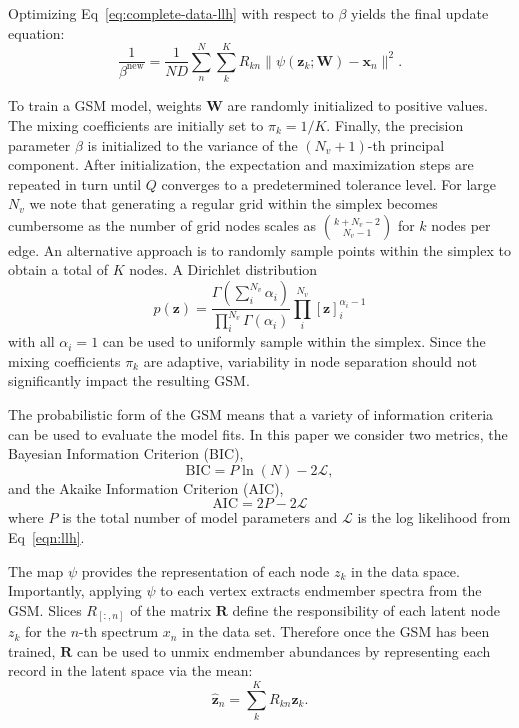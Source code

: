 \documentclass[remotesensing,article,submit,pdftex,moreauthors]{Definitions/mdpi}
\begin{document}
Optimizing Eq~\ref{eq:complete-data-llh} with respect to $\beta$ yields the final update equation:
\begin{equation}\label{eq:beta-update}
    \frac{1}{\beta^{\text{new}}}  = \frac{1}{ND}\sum\limits_n^N\sum\limits_k^K R_{kn}\lVert \psi(\mathbf{z}_k; \mathbf{W}) - \mathbf{x}_n \rVert^2.
\end{equation}

To train a GSM model, weights $\mathbf{W}$ are randomly initialized to positive values. The mixing coefficients are initially set to $\pi_k = 1/K$. Finally, the precision parameter $\beta$ is initialized to the variance of the $(N_v+1)$-th principal component. After initialization, the expectation and maximization steps are repeated in turn until $Q$ converges to a predetermined tolerance level. For large $N_v$ we note that generating a regular grid within the simplex becomes cumbersome as the number of grid nodes scales as ${k + N_v - 2 \choose N_v - 1}$ for $k$ nodes per edge. An alternative approach is to randomly sample points within the simplex to obtain a total of $K$ nodes. A Dirichlet distribution 
\begin{equation}
    p(\mathbf{z}) = \frac{\Gamma(\sum_i^{N_v}\alpha_i)}{\prod_{i}^{N_v}\Gamma(\alpha_i)} \prod_{i}^{N_v} [\mathbf{z}]_i^{\alpha_i-1}
\end{equation}
with all $\alpha_i=1$ can be used to uniformly sample within the simplex. Since the mixing coefficients $\pi_k$ are adaptive, variability in node separation should not significantly impact the resulting GSM.

The probabilistic form of the GSM means that a variety of information criteria can be used to evaluate the model fits. In this paper we consider two metrics, the Bayesian Information Criterion (BIC),
\begin{equation}
   \text{BIC} = P\ln(N) - 2\mathcal{L},
\end{equation}
and the Akaike Information Criterion (AIC),
\begin{equation}
    \text{AIC} = 2P - 2\mathcal{L}
\end{equation}
where $P$ is the total number of model parameters and $\mathcal{L}$ is the log likelihood from Eq~\ref{eqn:llh}.

The map $\psi$ provides the representation of each node $z_k$ in the data space. Importantly, applying $\psi$ to each vertex extracts endmember spectra from the GSM. Slices $R_{\left[:,n\right]}$ of the matrix $\mathbf{R}$ define the responsibility of each latent node $z_k$ for the $n$-th spectrum $x_n$ in the data set. Therefore once the GSM has been trained, $\mathbf{R}$ can be used to unmix endmember abundances by representing each record in the latent space via the mean: 
\begin{equation}
    \hat{\mathbf{z}}_n = \sum_k^K R_{kn}\mathbf{z}_k.
\end{equation}
\end{document}
